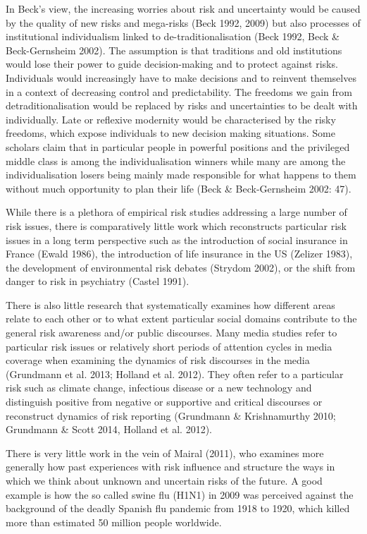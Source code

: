 In Beck's view, the increasing worries about risk and uncertainty would be caused by the quality of new risks and mega-risks (Beck 1992, 2009) but also processes of institutional individualism linked to de-traditionalisation (Beck 1992, Beck \& Beck-Gernsheim 2002). The assumption is that traditions and old institutions would lose their power to guide decision-making and to protect against risks. Individuals would increasingly have to make decisions and to reinvent themselves in a context of decreasing control and predictability. The freedoms we gain from detraditionalisation would be replaced by risks and uncertainties to be dealt with individually. Late or reflexive modernity would be characterised by the risky freedoms, which expose individuals to new decision making situations. Some scholars claim that in particular people in powerful positions and the privileged middle class is among the individualisation winners while many are among the individualisation losers being mainly made responsible for what happens to them without much opportunity to plan their life (Beck \& Beck-Gernsheim 2002: 47). 

While there is a plethora of empirical risk studies addressing a large number of risk issues, there is comparatively little work which reconstructs particular risk issues in a long term perspective such as the introduction of social insurance in France (Ewald 1986), the introduction of life insurance in the US (Zelizer 1983), the development of environmental risk debates (Strydom 2002), or the shift from danger to risk in psychiatry (Castel 1991). 

There is also little research that systematically examines how different areas relate to each other or to what extent particular social domains contribute to the general risk awareness and\slash or public discourses. Many media studies refer to particular risk issues or relatively short periods of attention cycles in media coverage when examining the dynamics of risk discourses in the media (Grundmann et al. 2013; Holland et al. 2012). They often refer to a particular risk such as climate change, infectious disease or a new technology and distinguish positive from negative or supportive and critical discourses or reconstruct dynamics of risk reporting (Grundmann \& Krishnamurthy 2010; Grundmann \& Scott 2014, Holland et al. 2012). 

There is very little work in the vein of Mairal (2011), who examines more generally how past experiences with risk influence and structure the ways in which we think about unknown and uncertain risks of the future. A good example is how the so called swine flu (H1N1) in 2009 was perceived against the background of the deadly Spanish flu pandemic from 1918 to 1920, which killed more than estimated 50 million people worldwide.

